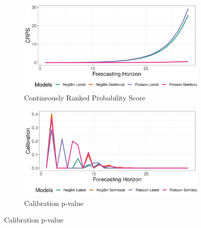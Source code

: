 \begin{figure}[H]
\begin{subfigure}{0.5\textwidth}
  \centering
  \includegraphics[width=\linewidth]{../output/Kayina_crps.png}  
  \caption{Contineously Ranked Probability Score}
  \label{Kayina_scores_1}
\end{subfigure}
\begin{subfigure}{0.5\textwidth}
  \centering
  \includegraphics[width=\linewidth]{../output/Kayina_calibration.png}  
  \caption{Calibration p-value}
  \label{Kayina_scores_2}
\end{subfigure}


\end{figure}
